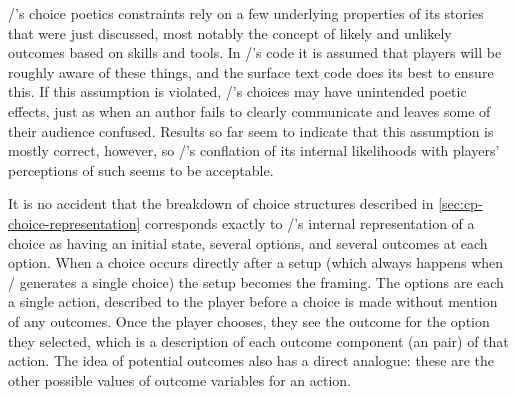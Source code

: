\dunyazad/'s choice poetics constraints rely on a few underlying properties of its stories that were just discussed, most notably the concept of likely and unlikely outcomes based on skills and tools.
%
In \dunyazad/'s code it is assumed that players will be roughly aware of these things, and the surface text code does its best to ensure this.
%
If this assumption is violated, \dunyazad/'s choices may have unintended poetic effects, just as when an author fails to clearly communicate and leaves some of their audience confused.
%
Results so far seem to indicate that this assumption is mostly correct, however, so \dunyazad/'s conflation of its internal likelihoods with players' perceptions of such seems to be acceptable.


It is no accident that the breakdown of choice structures described in \cref{sec:cp-choice-representation} corresponds exactly to \dunyazad/'s internal representation of a choice as having an initial state, several options, and several outcomes at each option.
%
When a choice occurs directly after a setup (which always happens when \dunyazad/ generates a single choice) the setup becomes the framing.
%
The options are each a single action, described to the player before a choice is made without mention of any outcomes.
%
Once the player chooses, they see the outcome for the option they selected, which is a description of each outcome component (an  pair) of that action.
%
The idea of potential outcomes also has a direct analogue: these are the other possible values of outcome variables for an action.



